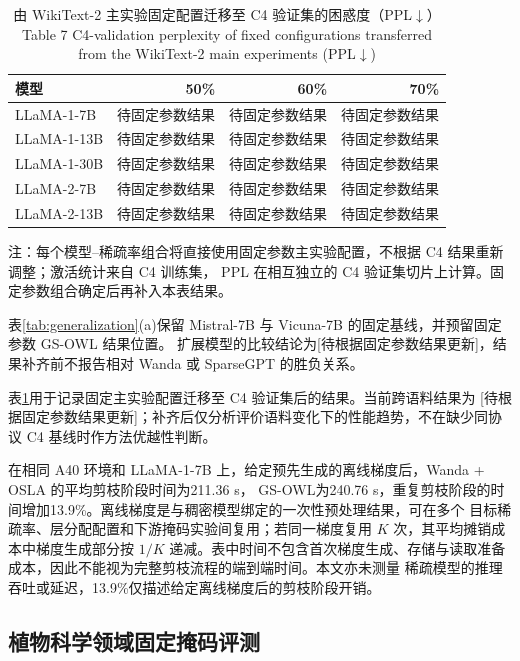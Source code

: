 \documentclass[UTF8,fontset=fandol]{ctexart}
\renewcommand{\arraystretch}{1.08}
\newcommand{\method}{GS-OWL}
\begin{document}
\begin{table}[!htbp]
\centering
\caption{由 WikiText-2 主实验固定配置迁移至 C4 验证集的困惑度（PPL$\downarrow$）\\
Table 7 C4-validation perplexity of fixed configurations transferred from the WikiText-2 main experiments (PPL$\downarrow$)}
\label{tab:c4_validation}
\scriptsize
\setlength{\tabcolsep}{7.0pt}
\renewcommand{\arraystretch}{0.98}
\begin{tabular}{lrrr}
\toprule
模型 & 50\% & 60\% & 70\% \\
\midrule
LLaMA-1-7B  & 待固定参数结果 & 待固定参数结果 & 待固定参数结果 \\
LLaMA-1-13B & 待固定参数结果 & 待固定参数结果 & 待固定参数结果 \\
LLaMA-1-30B & 待固定参数结果 & 待固定参数结果 & 待固定参数结果 \\
LLaMA-2-7B  & 待固定参数结果 & 待固定参数结果 & 待固定参数结果 \\
LLaMA-2-13B & 待固定参数结果 & 待固定参数结果 & 待固定参数结果 \\
\bottomrule
\end{tabular}
\vspace{2pt}
\parbox{0.88\textwidth}{\scriptsize
注：每个模型--稀疏率组合将直接使用固定参数主实验配置，不根据 C4 结果重新调整；激活统计来自 C4 训练集，
PPL 在相互独立的 C4 验证集切片上计算。固定参数组合确定后再补入本表结果。}
\end{table}

表\ref{tab:generalization}(a)保留 Mistral-7B 与 Vicuna-7B 的固定基线，并预留固定参数 GS-OWL 结果位置。
扩展模型的比较结论为[待根据固定参数结果更新]，结果补齐前不报告相对 Wanda 或 SparseGPT 的胜负关系。

表\ref{tab:c4_validation}用于记录固定主实验配置迁移至 C4 验证集后的结果。当前跨语料结果为
[待根据固定参数结果更新]；补齐后仅分析评价语料变化下的性能趋势，不在缺少同协议 C4 基线时作方法优越性判断。

在相同 A40 环境和 LLaMA-1-7B 上，给定预先生成的离线梯度后，Wanda + OSLA 的平均剪枝阶段时间为211.36 s，
\method 为240.76 s，重复剪枝阶段的时间增加13.9\%。离线梯度是与稠密模型绑定的一次性预处理结果，可在多个
目标稀疏率、层分配配置和下游掩码实验间复用；若同一梯度复用 $K$ 次，其平均摊销成本中梯度生成部分按 $1/K$
递减。表中时间不包含首次梯度生成、存储与读取准备成本，因此不能视为完整剪枝流程的端到端时间。本文亦未测量
稀疏模型的推理吞吐或延迟，13.9\%仅描述给定离线梯度后的剪枝阶段开销。

\FloatBarrier
\subsection{植物科学领域固定掩码评测}
\end{document}
